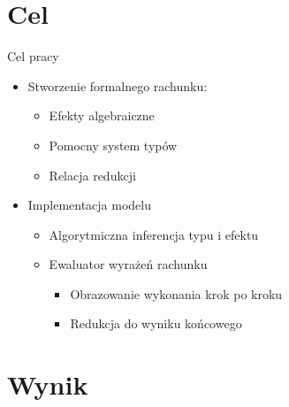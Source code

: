 \documentclass{beamer}
\begin{document}
\section{Cel}
\begin{frame}{Cel pracy}
  \begin{itemize}
    \item Stworzenie formalnego rachunku:
    \begin{itemize}
      \item Efekty algebraiczne
      \item Pomocny system typów
      \item Relacja redukcji
    \end{itemize}
    \item Implementacja modelu
    \begin{itemize}
      \item Algorytmiczna inferencja typu i efektu
      \item Ewaluator wyrażeń rachunku
      \begin{itemize}
        \item Obrazowanie wykonania krok po kroku
        \item Redukcja do wyniku końcowego
      \end{itemize}
    \end{itemize}
  \end{itemize}
\end{frame}


\section{Wynik}

\end{document}
